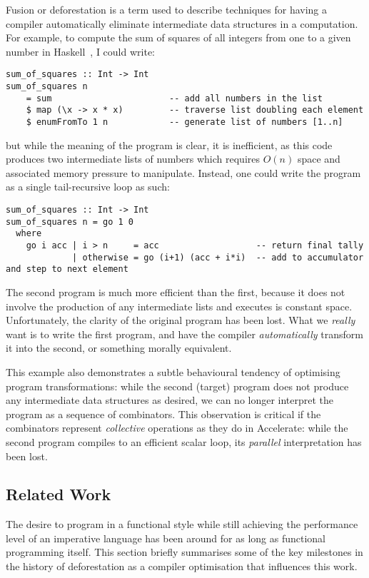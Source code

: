 Fusion or deforestation is a term used to describe techniques for having a
compiler automatically eliminate intermediate data structures in a computation.
For example, to compute the sum of squares of all integers from one to a given
number in Haskell~\cite{Haskell:1998}, I could write:
%
\begin{lstlisting}[style=haskell]
sum_of_squares :: Int -> Int
sum_of_squares n
    = sum                       -- add all numbers in the list
    $ map (\x -> x * x)         -- traverse list doubling each element
    $ enumFromTo 1 n            -- generate list of numbers [1..n]
\end{lstlisting}
%
but while the meaning of the program is clear, it is inefficient, as this code
produces two intermediate lists of numbers which requires $O(n)$ space and
associated memory pressure to manipulate. Instead, one could write the program
as a single tail-recursive loop as such:
%
\begin{lstlisting}[style=haskell]
sum_of_squares :: Int -> Int
sum_of_squares n = go 1 0
  where
    go i acc | i > n     = acc                   -- return final tally
             | otherwise = go (i+1) (acc + i*i)  -- add to accumulator and step to next element
\end{lstlisting}
%
The second program is much more efficient than the first, because it does not
involve the production of any intermediate lists and executes is constant space.
Unfortunately, the clarity of the original program has been lost. What we
\emph{really} want is to write the first program, and have the compiler
\emph{automatically} transform it into the second, or something morally
equivalent.

This example also demonstrates a subtle behavioural tendency of optimising
program transformations: while the second (target) program does not produce any
intermediate data structures as desired, we can no longer interpret the program
as a sequence of combinators. This observation is critical if the combinators
represent \emph{collective} operations as they do in Accelerate: while the
second program compiles to an efficient scalar loop, its \emph{parallel}
interpretation has been lost.


\subsection{Related Work}

The desire to program in a functional style while still achieving the
performance level of an imperative language has been around for as long as
functional programming itself. This section briefly summarises some of the key
milestones in the history of deforestation as a compiler optimisation that
influences this work.

